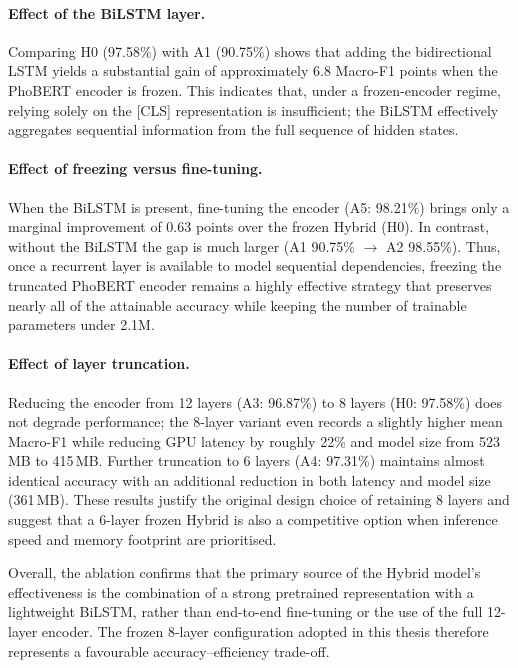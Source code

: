 \documentclass[12pt]{report} %
\begin{document}
\paragraph{Effect of the BiLSTM layer.}
Comparing H0 (97.58\%) with A1 (90.75\%) shows that adding the bidirectional LSTM yields a substantial gain of approximately 6.8 Macro-F1 points when the PhoBERT encoder is frozen. This indicates that, under a frozen-encoder regime, relying solely on the [CLS] representation is insufficient; the BiLSTM effectively aggregates sequential information from the full sequence of hidden states.

\paragraph{Effect of freezing versus fine-tuning.}
When the BiLSTM is present, fine-tuning the encoder (A5: 98.21\%) brings only a marginal improvement of 0.63 points over the frozen Hybrid (H0). In contrast, without the BiLSTM the gap is much larger (A1 90.75\% $\rightarrow$ A2 98.55\%). Thus, once a recurrent layer is available to model sequential dependencies, freezing the truncated PhoBERT encoder remains a highly effective strategy that preserves nearly all of the attainable accuracy while keeping the number of trainable parameters under 2.1M.

\paragraph{Effect of layer truncation.}
Reducing the encoder from 12 layers (A3: 96.87\%) to 8 layers (H0: 97.58\%) does not degrade performance; the 8-layer variant even records a slightly higher mean Macro-F1 while reducing GPU latency by roughly 22\% and model size from 523\,MB to 415\,MB. Further truncation to 6 layers (A4: 97.31\%) maintains almost identical accuracy with an additional reduction in both latency and model size (361\,MB). These results justify the original design choice of retaining 8 layers and suggest that a 6-layer frozen Hybrid is also a competitive option when inference speed and memory footprint are prioritised.

Overall, the ablation confirms that the primary source of the Hybrid model's effectiveness is the combination of a strong pretrained representation with a lightweight BiLSTM, rather than end-to-end fine-tuning or the use of the full 12-layer encoder. The frozen 8-layer configuration adopted in this thesis therefore represents a favourable accuracy--efficiency trade-off.
\end{document}
